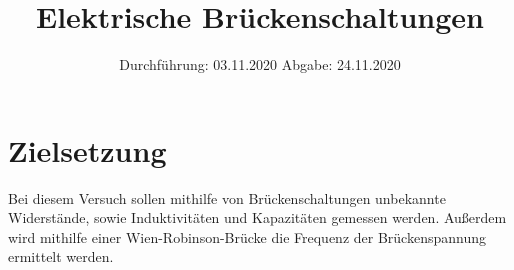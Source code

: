 
\usepackage{tikz}

\subject{V302}
\title{Elektrische Brückenschaltungen}
\date{
    Durchführung: 03.11.2020
    \hspace{3em}
    Abgabe: 24.11.2020
}



\maketitle
\thispagestyle{empty}
\tableofcontents
\newpage

\section{Zielsetzung} \label{sec:Ziel}

Bei diesem Versuch sollen mithilfe von Brückenschaltungen unbekannte Widerstände, sowie Induktivitäten und Kapazitäten gemessen werden.
Außerdem wird mithilfe einer Wien-Robinson-Brücke die Frequenz der Brückenspannung ermittelt werden.


\newpage


\newpage


\newpage


\newpage


